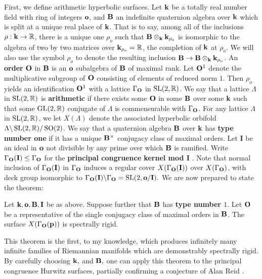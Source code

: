 \documentclass[12pt]{article}
\begin{document}
First,  we define arithmetic hyperbolic surfaces. Let  $\mathbf{k}$ be a totally real number field with ring of integers $\mathbf{o}$,  and $\mathbf{B}$ an indefinite quaternion algebra over $\mathbf{k}$ which is split at a unique real place of $\mathbf{k}$. That is to say, among all of the inclusions $\rho:  \mathbf{k} \to \mathbb{R}$, there is a unique  one $\rho_o$ such that $\mathbf{B} \otimes_{\mathbf{k}}  \mathbf{k}_{\rho_o} $ is isomorphic to the algebra of two by two matrices over $\mathbf{k}_{\rho_o} =\mathbb{R}$, the completion of $\mathbf{k}$ at $\rho_o$.  We will also use the symbol $\rho_o$ to denote the resulting inclusion $\mathbf{B} \to \mathbf{B} \otimes_{\mathbf{k}}  \mathbf{k}_{\rho_o} $. An {\bf order} $\mathbf{O}$ in $\mathbf{B}$ is an $\mathbf{o}$ subalgebra of $\mathbf{B}$ of maximal rank.  Let $\mathbf{O}^1$ denote the multiplicative subgroup  of $\mathbf{O}$ consisting of elements of reduced norm  $1$.  Then $\rho_o$ yields an identification $\mathbf{O}^1$ with a lattice $\Gamma_{\mathbf{O}}$ in $\operatorname{SL}(2,\mathbb{R})$.  We say that a lattice $\Lambda$ in $\operatorname{SL}(2,\mathbb{R})$ is {\bf arithmetic}  if there exists some $\mathbf{O}$ in some $\mathbf{B}$ over some $\mathbf{k}$ such that some $\operatorname{GL}(2,\mathbb{R})$ conjugate of $\Lambda$ is commensurable with $\Gamma_{\mathbf{O}}$.  For any lattice $\Lambda$ in $\operatorname{SL}(2,\mathbb{R})$, we let $X(\Lambda)$ denote the associated hyperbolic orbifold  $\Lambda \backslash \operatorname{SL}(2,\mathbb{R}) /  \operatorname{SO}(2)$.  We say that a quaternion algebra $\mathbf{B}$ over $\mathbf{k}$ has {\bf type number one} if it has a unique $\mathbf{B}^\times$ conjugacy class of maximal orders.  Let $\mathbf{I}$ be an ideal in $\mathbf{o}$ not divisible by any prime over which $\mathbf{B}$ is ramified.   Write $\Gamma_{\mathbf{O}}(\mathbf{I}) \leq \Gamma_{\mathbf{O}}$ for the  {\bf principal congruence kernel mod $\mathbf{I}$} . Note that normal inclusion of $\Gamma_{\mathbf{O}}(\mathbf{I})$ in $\Gamma_{\mathbf{O}}$ induces a regular cover $X(\Gamma_{\mathbf{O}}(\mathbf{I}))$ over $X(\Gamma_{\mathbf{O}})$, with deck group isomorphic to  $\Gamma_{\mathbf{O}}(\mathbf{I})  \backslash \Gamma_{\mathbf{O}} = \operatorname{SL}(2,\mathbf{o} /\mathbf{I}).$  We are now prepared to state the theorem:
 \begin{thm}
 	Let $\mathbf{k}, \mathbf{o}, \mathbf{B}, \mathbf{I}$ be as above. Suppose further that $\mathbf{B}$ has {\bf type number $1$}. Let $\mathbf{O}$ be a representative of the single conjugacy class of maximal orders in $\mathbf{B}$. The surface $X(\Gamma_{\mathbf{O}}(\mathbf{p}))$  is spectrally rigid. 
 \end{thm}
This theorem is the first, to my knowledge, which  produces infinitely many infinite families of Riemannian manifolds which are demonstrably spectrally rigid. By carefully  choosing $\mathbf{k},$ and $\mathbf{B},$ one can  apply this theorem to the principal congruence Hurwitz surfaces, partially confirming a conjecture of Alan Reid \cite{reid2014}. 
\end{document}
